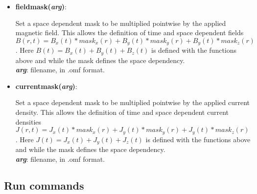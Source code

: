 \begin{itemize}
 \item {\vspace{-0.4cm}\textbf{fieldmask(\textit{arg})}:
				\flushright\parbox{0.9 \textwidth}{\vspace{-0.25cm} 
				Set a space dependent mask to be multiplied pointwise by the applied magnetic field.  This allows the definition of time and space dependent fields $B(r,t) = B_x(t)*mask_x(r) + B_y(t)*mask_y(r) + B_y(t)*mask_z(r)$.  Here $B(t)= B_x(t) + B_y(t) + B_z(t)$ is defined with the functions above and while the mask defines the space dependency.\\
				\textbf{\textit{arg}}: filename, in .omf format.
				}\flushleft}

 \item {\vspace{-0.4cm}\textbf{currentmask(\textit{arg})}:
				\flushright\parbox{0.9 \textwidth}{\vspace{-0.25cm} 
				Set a space dependent mask to be multiplied pointwise by the applied current density.  This allows the definition of time and space dependent current densities $J(r,t) = J_x(t)*mask_x(r) + J_y(t)*mask_y(r) + J_y(t)*mask_z(r)$.  Here $J(t)= J_x(t) + J_y(t) + J_z(t)$ is defined with the functions above and while the mask defines the space dependency.\\
				\textbf{\textit{arg}}: filename, in .omf format.
				}\flushleft}

\end{itemize}



\subsection{Run commands}

